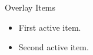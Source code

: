 \documentclass[14pt,t]{beamer-accessibility}
\begin{document}
\begin{frame}{Overlay Items}
\begin{itemize}
\item<1-> First active item.
\item<2-> Second active item.
\end{itemize}
\end{frame}
\end{document}
